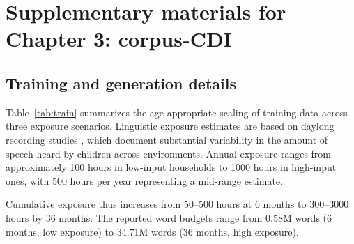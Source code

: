 \chapter[Supplementary materials for Chapter 3]{Supplementary materials for Chapter 3: corpus-CDI}
\label{app:vocabulary}
\begingroup
\graphicspath{{ch3/papers/exp_vocab/}}
\providecommand{\meCDI}{\textsc{corpus-CDI}}


\section{Training and generation details}

Table~\ref{tab:train} summarizes the age-appropriate scaling of training data across three exposure scenarios. Linguistic exposure estimates are based on daylong recording studies \citep{cristia2019child}, which document substantial variability in the amount of speech heard by children across environments. Annual exposure ranges from approximately 100 hours in low-input households to 1000 hours in high-input ones, with 500 hours per year representing a mid-range estimate.

Cumulative exposure thus increases from 50–500 hours at 6 months to 300–3000 hours by 36 months. The reported word budgets range from 0.58M words (6 months, low exposure) to 34.71M words (36 months, high exposure).



